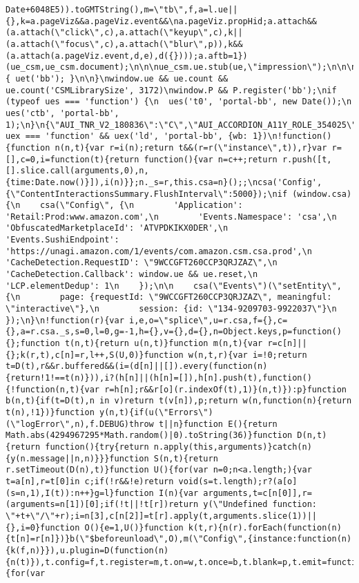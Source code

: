 \documentclass[
]{article}
\begin{document}
\begin{verbatim}
Date+6048E5)).toGMTString(),m=\"tb\",f,a=l.ue||{},k=a.pageViz&&a.pageViz.event&&\na.pageViz.propHid;a.attach&&(a.attach(\"click\",c),a.attach(\"keyup\",c),k||(a.attach(\"focus\",c),a.attach(\"blur\",p)),k&&(a.attach(a.pageViz.event,d,e),d({})));a.aftb=1})(ue_csm,ue_csm.document);\n\n\nue_csm.ue.stub(ue,\"impression\");\n\n\nue.stub(ue,\"trigger\");\n\n\nif(window.ue&&uet) { uet('bb'); }\n\n}\nwindow.ue && ue.count && ue.count('CSMLibrarySize', 3172)\nwindow.P && P.register('bb');\nif (typeof ues === 'function') {\n  ues('t0', 'portal-bb', new Date());\n  ues('ctb', 'portal-bb', 1);\n}\n{\"AUI_TNR_V2_180836\":\"C\",\"AUI_ACCORDION_A11Y_ROLE_354025\":\"C\",\"AUI_PRELOAD_261698\":\"C\",\"AUI_LAUNCH_2021_ALLY_FIXES_392482\":\"T1\",\"AUI_TEMPLATE_WEBLAB_CACHE_333406\":\"C\",\"AUI_72554\":\"C\",\"AUI_KILLSWITCH_CSA_LOGGER_372963\":\"C\",\"AUI_REL_NOREFERRER_NOOPENER_309527\":\"C\",\"AUI_PCI_RISK_BANNER_210084\":\"C\"}typeof uex === 'function' && uex('ld', 'portal-bb', {wb: 1})\n!function(){function n(n,t){var r=i(n);return t&&(r=r(\"instance\",t)),r}var r=[],c=0,i=function(t){return function(){var n=c++;return r.push([t,[].slice.call(arguments,0),n,{time:Date.now()}]),i(n)}};n._s=r,this.csa=n}();;\ncsa('Config', {\"ContentInteractionsSummary.FlushInterval\":5000});\nif (window.csa) {\n    csa(\"Config\", {\n        'Application': 'Retail:Prod:www.amazon.com',\n        'Events.Namespace': 'csa',\n        'ObfuscatedMarketplaceId': 'ATVPDKIKX0DER',\n        'Events.SushiEndpoint': 'https://unagi.amazon.com/1/events/com.amazon.csm.csa.prod',\n        'CacheDetection.RequestID': \"9WCCGFT260CCP3QRJZAZ\",\n        'CacheDetection.Callback': window.ue && ue.reset,\n        'LCP.elementDedup': 1\n    });\n\n    csa(\"Events\")(\"setEntity\", {\n        page: {requestId: \"9WCCGFT260CCP3QRJZAZ\", meaningful: \"interactive\"},\n        session: {id: \"134-9209703-9922037\"}\n    });\n}\n!function(r){var i,e,o=\"splice\",u=r.csa,f={},c={},a=r.csa._s,s=0,l=0,g=-1,h={},v={},d={},n=Object.keys,p=function(){};function t(n,t){return u(n,t)}function m(n,t){var r=c[n]||{};k(r,t),c[n]=r,l++,S(U,0)}function w(n,t,r){var i=!0;return t=D(t),r&&r.buffered&&(i=(d[n]||[]).every(function(n){return!1!==t(n)})),i?(h[n]||(h[n]=[]),h[n].push(t),function(){!function(n,t){var r=h[n];r&&r[o](r.indexOf(t),1)}(n,t)}):p}function b(n,t){if(t=D(t),n in v)return t(v[n]),p;return w(n,function(n){return t(n),!1})}function y(n,t){if(u(\"Errors\")(\"logError\",n),f.DEBUG)throw t||n}function E(){return Math.abs(4294967295*Math.random()|0).toString(36)}function D(n,t){return function(){try{return n.apply(this,arguments)}catch(n){y(n.message||n,n)}}}function S(n,t){return r.setTimeout(D(n),t)}function U(){for(var n=0;n<a.length;){var t=a[n],r=t[0]in c;if(!r&&!e)return void(s=t.length);r?(a[o](s=n,1),I(t)):n++}g=l}function I(n){var arguments,t=c[n[0]],r=(arguments=n[1])[0];if(!t||!t[r])return y(\"Undefined function: \"+t+\"/\"+r);i=n[3],c[n[2]]=t[r].apply(t,arguments.slice(1))||{},i=0}function O(){e=1,U()}function k(t,r){n(r).forEach(function(n){t[n]=r[n]})}b(\"$beforeunload\",O),m(\"Config\",{instance:function(n){k(f,n)}}),u.plugin=D(function(n){n(t)}),t.config=f,t.register=m,t.on=w,t.once=b,t.blank=p,t.emit=function(n,t,r){for(var 
\end{verbatim}
\end{document}
